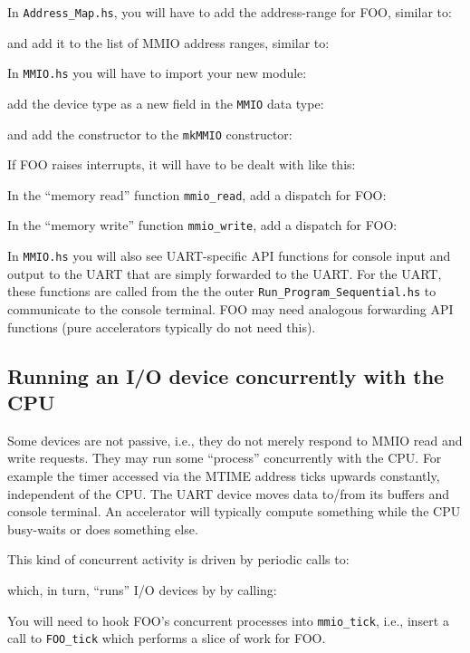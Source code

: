 \documentclass[11pt]{article}
\begin{document}
In \verb|Address_Map.hs|, you will have to add the address-range for
FOO, similar to:



and add it to the list of MMIO address ranges, similar to:



In \verb|MMIO.hs| you will have to import your new module:



add the device type as a new field in the \verb|MMIO| data type:



and add the constructor to the \verb|mkMMIO| constructor:



If FOO raises interrupts, it will have to be dealt with like this:



In the ``memory read'' function \verb|mmio_read|, add a dispatch for FOO:



In the ``memory write'' function \verb|mmio_write|, add a dispatch for FOO:



In \verb|MMIO.hs| you will also see UART-specific API functions for
console input and output to the UART that are simply forwarded to the
UART.  For the UART, these functions are called from the the outer
\verb|Run_Program_Sequential.hs| to communicate to the console
terminal.  FOO may need analogous forwarding API functions (pure
accelerators typically do not need this).


\subsection{Running an I/O device concurrently with the CPU}

Some devices are not passive, i.e., they do not merely respond to MMIO
read and write requests.  They may run some ``process'' concurrently
with the CPU.  For example the timer accessed via the MTIME address
ticks upwards constantly, independent of the CPU.  The UART device
moves data to/from its buffers and console terminal.  An accelerator
will typically compute something while the CPU busy-waits or does
something else.

This kind of concurrent activity is driven by periodic calls to:



which, in turn, ``runs'' I/O devices by by calling:



You will need to hook FOO's concurrent processes into
\verb|mmio_tick|, i.e., insert a call to \verb|FOO_tick| which
performs a slice of work for FOO.

\end{document}
